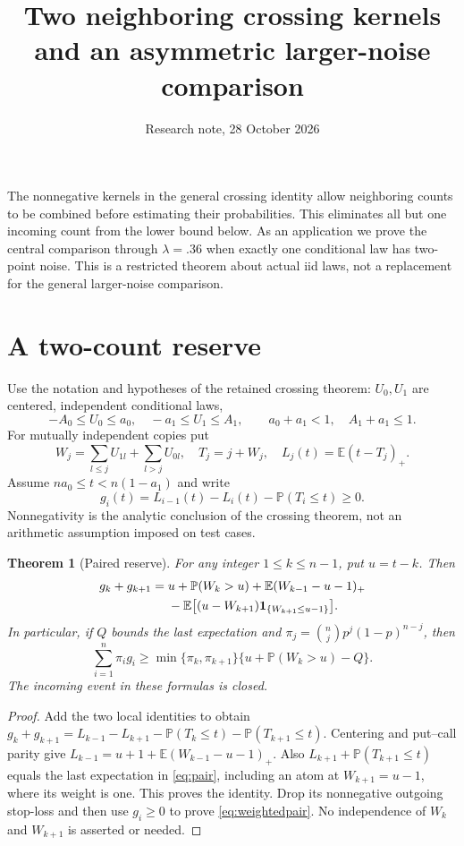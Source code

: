 \documentclass[11pt,a4paper]{article}
\title{Two neighboring crossing kernels and an asymmetric larger-noise comparison}
\author{Research note, 28 October 2026}\date{}
\newcommand{\E}{\mathbb E}\newcommand{\Pp}{\mathbb P}
\newtheorem{theorem}{Theorem}\newtheorem{lemma}[theorem]{Lemma}
\begin{document}
\maketitle

The nonnegative kernels in the general crossing identity allow neighboring
counts to be combined before estimating their probabilities. This eliminates
all but one incoming count from the lower bound below. As an application we
prove the central comparison through $\lambda=.36$ when exactly one
conditional law has two-point noise. This is a restricted theorem about
actual iid laws, not a replacement for the general larger-noise comparison.

\section{A two-count reserve}
Use the notation and hypotheses of the retained crossing theorem:
$U_0,U_1$ are centered, independent conditional laws,
\[
 -A_0\le U_0\le a_0,\quad -a_1\le U_1\le A_1,
 \qquad a_0+a_1<1,\quad A_1+a_1\le1.
\]
For mutually independent copies put
\[
 W_j=\sum_{l\le j}U_{1l}+\sum_{l>j}U_{0l},\quad T_j=j+W_j,
 \quad L_j(t)=\E(t-T_j)_+.
\]
Assume $na_0\le t<n(1-a_1)$ and write
\[
 g_i(t)=L_{i-1}(t)-L_i(t)-\Pp(T_i\le t)\ge0.
\]
Nonnegativity is the analytic conclusion of the crossing theorem, not an
arithmetic assumption imposed on test cases.

\begin{theorem}[Paired reserve]\label{thm:pair}
For any integer $1\le k\le n-1$, put $u=t-k$. Then
\begin{align}\label{eq:pair}
 g_k+g_{k+1}
 ={}&u+\Pp(W_k>u)+\E(W_{k-1}-u-1)_+\notag\\
 &-\E\bigl[(u-W_{k+1})\mathbf1_{\{W_{k+1}\le u-1\}}\bigr].
\end{align}
In particular, if $Q$ bounds the last expectation and
$\pi_j=\binom njp^j(1-p)^{n-j}$, then
\begin{equation}\label{eq:weightedpair}
 \sum_{i=1}^n\pi_i g_i\ge
 \min\{\pi_k,\pi_{k+1}\}\{u+\Pp(W_k>u)-Q\}.
\end{equation}
The incoming event in these formulas is closed.
\end{theorem}
\begin{proof}
Add the two local identities to obtain
$g_k+g_{k+1}=L_{k-1}-L_{k+1}-\Pp(T_k\le t)-\Pp(T_{k+1}\le t)$.
Centering and put--call parity give
$L_{k-1}=u+1+\E(W_{k-1}-u-1)_+$.
Also $L_{k+1}+\Pp(T_{k+1}\le t)$ equals the last expectation in
\eqref{eq:pair}, including an atom at $W_{k+1}=u-1$, where its weight is one.
This proves the identity. Drop its nonnegative outgoing stop-loss and then
use $g_i\ge0$ to prove \eqref{eq:weightedpair}. No independence of $W_k$
and $W_{k+1}$ is asserted or needed.
\end{proof}
\end{document}
